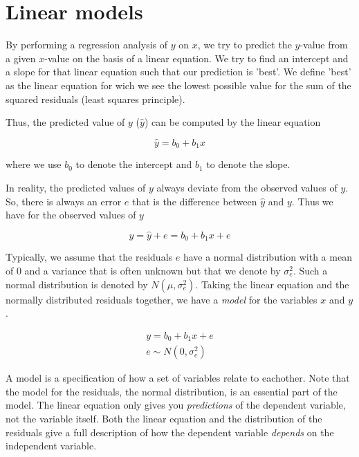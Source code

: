 \documentclass[]{book}\usepackage[]{graphicx}\usepackage[]{color}
\begin{document}
\section{Linear models}

By performing a regression analysis of $y$ on $x$, we try to predict the $y$-value from a given $x$-value on the basis of a linear equation. We try to find an intercept and a slope for that linear equation such that our prediction is 'best'. We define 'best' as the linear equation for wich we see the lowest possible value for the sum of the squared residuals (least squares principle).

Thus, the predicted value of $y$ ($\hat{y}$) can be computed by the linear equation

\begin{equation}
\hat{y}= b_0 + b_1 x
\end{equation}

where we use $b_0$ to denote the intercept and $b_1$ to denote the slope. 

In reality, the predicted values of $y$ always deviate from the observed values of $y$. So, there is always an error $e$ that is the difference between $\hat{y}$ and $y$. Thus we have for the observed values of $y$

\begin{equation}
y = \hat{y} + e = b_0 + b_1 x + e
\end{equation}

Typically, we assume that the residuals $e$ have a normal distribution with a mean of 0 and a variance that is often unknown but that we denote by $\sigma^2_e$. Such a normal distribution is denoted by $N(\mu,\sigma^2_e)$. Taking the linear equation and the normally distributed residuals together, we have a \textit{model} for the variables $x$ and $y$.


\begin{eqnarray}
\label{eq:linear_model1}
y = b_0 + b_1 x + e \\
\label{eq:linear_model2}
e \sim N(0,\sigma^2_e) 
\end{eqnarray}

A model is a specification of how a set of variables relate to eachother. Note that the model for the residuals, the normal distribution, is an essential part of the model. The linear equation only gives you \textit{predictions} of the dependent variable, not the variable itself. Both the linear equation and the distribution of the residuals give a full description of how the dependent variable \textit{depends} on the independent variable. 
\end{document}
